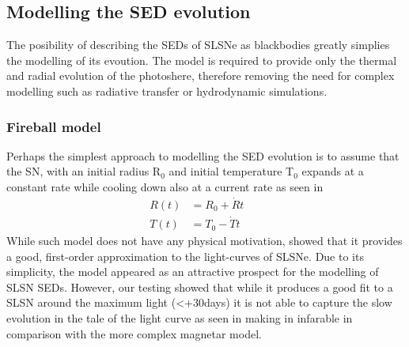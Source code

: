 \subsection{Modelling the SED evolution}
The posibility of describing the SEDs of SLSNe as blackbodies greatly simplies the
modelling of its evoution. The model is required to provide only the thermal and radial evolution of the photoshere, therefore removing the need for complex modelling such as radiative transfer or hydrodynamic simulations.

\subsubsection{Fireball model}
Perhaps the simplest approach to modelling the SED evolution is to assume that the SN, with an initial radius R$_{0}$ and initial temperature T$_{0}$ expands at a constant rate while cooling down also at a current rate as seen in 
\begin{align}
\label{eq:Howell}
R(t) &= R_0 + \dot{R}t &&\\
T(t) &= T_0 - \dot{T}t &&
\end{align}
\noindent While such model does not have any physical motivation, \citet{Howell2013} showed that it provides a good, first-order approximation to the light-curves of SLSNe. Due to its simplicity, the model appeared as an attractive prospect for the modelling of SLSN SEDs. However, our testing showed that while it produces a good fit to a SLSN around the maximum light (<+30days) it is not able to capture the slow evolution in the tale of the light curve as seen in  making in infarable in comparison with the more complex magnetar model.

